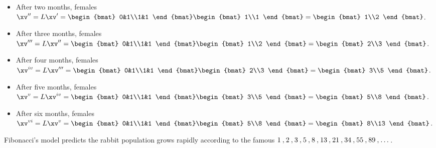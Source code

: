 \begin{reduce}
\begin{example}
\begin{itemize}
\item After two months,  females \(\xv''=L\xv'=\begin{bmat} 0&1\\1&1 \end{bmat}\begin{bmat} 1\\1 \end{bmat}=\begin{bmat} 1\\2 \end{bmat}\).
\item After three months,  females \(\xv'''=L\xv''=\begin{bmat} 0&1\\1&1 \end{bmat}\begin{bmat} 1\\2 \end{bmat}=\begin{bmat} 2\\3 \end{bmat}\).
\item After four months,  females \(\xv^{iv}=L\xv'''=\begin{bmat} 0&1\\1&1 \end{bmat}\begin{bmat} 2\\3 \end{bmat}=\begin{bmat} 3\\5 \end{bmat}\).
\item After five months,  females \(\xv^{v}=L\xv^{iv}=\begin{bmat} 0&1\\1&1 \end{bmat}\begin{bmat} 3\\5 \end{bmat}=\begin{bmat} 5\\8 \end{bmat}\).
\item After six months,  females \(\xv^{vi}=L\xv^{v}=\begin{bmat} 0&1\\1&1 \end{bmat}\begin{bmat} 5\\8 \end{bmat}=\begin{bmat} 8\\13 \end{bmat}\).
\end{itemize}
Fibonacci's model predicts the rabbit population grows rapidly according to the famous  \(\mathcode`\,="213B 1,2,3,5,8,13,21,34,55,89,\ldots\)\,.
\end{example}
\end{reduce}



